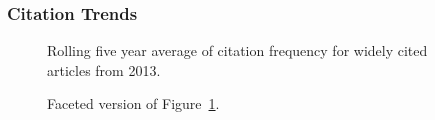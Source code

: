 \documentclass[
  10pt,
  letterpaper,
  DIV=11,
  numbers=noendperiod,
  twoside]{scrartcl}
\begin{document}
\subsubsection*{Citation Trends}\label{sec-trends-2013}

\begin{figure}


\caption{\label{fig-citation-spaghetti-2013}Rolling five year average of
citation frequency for widely cited articles from 2013.}

\end{figure}%

\begin{figure}


\caption{\label{fig-citation-facet-2013}Faceted version of
Figure~\ref{fig-citation-spaghetti-2013}.}

\end{figure}%
\end{document}
